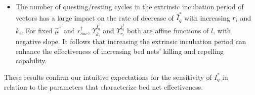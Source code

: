 \documentclass[a4paper]{article}
\newcommand{\varpiVar}{r_{suc}}
\begin{document}
\begin{itemize}
\item
The number of questing/resting cycles in the extrinsic incubation period of vectors has a large impact on the rate of decrease of $\bar I^*_q$  with increasing $r_i$ and $k_i$. For fixed $\hat \mu^\dagger $ and $\varpiVar ^\dagger $, $\varUpsilon_{k_i}^{\bar I_q^\dagger }$ and $\varUpsilon_{r_i}^{\bar I_q^\dagger }$   both are affine functions of $l$, with negative slope. It follows that increasing the extrinsic incubation period can enhance the effectiveness of increasing bed nets' killing and repelling capability. %
\end{itemize}
These results confirm our intuitive expectations for the  sensitivity of $I_q^*$ in relation to the parameters that characterize bed net effectiveness.
%
%
\end{document}
